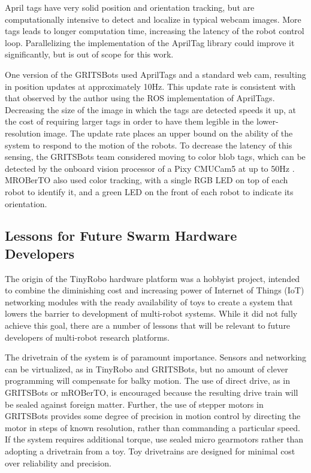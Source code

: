 \documentclass[]{article}
\begin{document}
April tags have very solid position and orientation tracking, but are computationally intensive to detect and localize in typical webcam images. 
More tags leads to longer computation time, increasing the latency of the robot control loop. 
Parallelizing the implementation of the AprilTag library could improve it significantly, but is out of scope for this work. 

One version of the GRITSBots used AprilTags and a standard web cam, resulting in position updates at approximately 10Hz. 
This update rate is consistent with that observed by the author using the ROS implementation of AprilTags. 
Decreasing the size of the image in which the tags are detected speeds it up, at the cost of requiring larger tags in order to have them legible in the lower-resolution image. 
The update rate places an upper bound on the ability of the system to respond to the motion of the robots. 
To decrease the latency of this sensing, the GRITSBots team considered moving to color blob tags, which can be detected by the onboard vision processor of a Pixy CMUCam5 at up to 50Hz \cite{PickemGrits2014}. 
MROBerTO also used color tracking, with a single RGB LED on top of each robot to identify it, and a green LED on the front of each robot to indicate its orientation. 

\subsection{Lessons for Future Swarm Hardware Developers}

The origin of the TinyRobo hardware platform was a hobbyist project, intended to combine the diminishing cost and increasing power of Internet of Things (IoT) networking modules with the ready availability of toys to create a system that lowers the barrier to development of multi-robot systems.
While it did not fully achieve this goal, there are a number of lessons that will be relevant to future developers of multi-robot research platforms. 

The drivetrain of the system is of paramount importance. 
Sensors and networking can be virtualized, as in TinyRobo and GRITSBots, but no amount of clever programming will compensate for balky motion. 
The use of direct drive, as in GRITSBots or mROBerTO, is encouraged because the resulting drive train will be sealed against foreign matter. 
Further, the use of stepper motors in GRITSBots provides some degree of precision in motion control by directing the motor in steps of known resolution, rather than commanding a particular speed. 
If the system requires additional torque, use sealed micro gearmotors rather than adopting a drivetrain from a toy. 
Toy drivetrains are designed for minimal cost over reliability and precision. 
\end{document}
